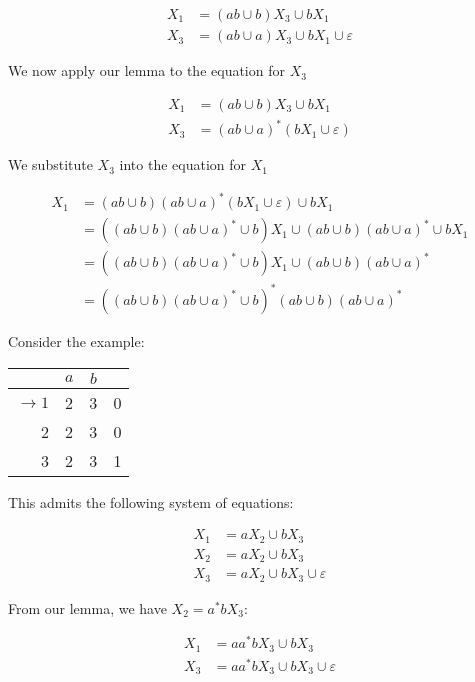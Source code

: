 \begin{align*}
      X_1 &= (ab\cup b)X_3\cup bX_1\\
      X_3 &= (ab\cup a)X_3\cup bX_1\cup\varepsilon
\end{align*}

We now apply our lemma to the equation for \(X_3\)

\begin{align*}
      X_1 &= (ab\cup b)X_3\cup bX_1\\
      X_3 &= {(ab\cup a)}^*(bX_1\cup\varepsilon)
\end{align*}

We substitute \(X_3\) into the equation for \(X_1\)

\begin{align*}
      X_1 &= (ab\cup b){(ab\cup a)}^*(bX_1\cup\varepsilon)\cup bX_1\\
          &= \left((ab\cup b){(ab\cup a)}^*\cup b\right)X_1\cup (ab\cup b){(ab\cup a)}^*\cup bX_1\\
          &= \left((ab\cup b){(ab\cup a)}^*\cup b\right)X_1\cup (ab\cup b){(ab\cup a)}^*\\
          &= {\left((ab\cup b){(ab\cup a)}^*\cup b\right)}^*(ab\cup b){(ab\cup a)}^*
\end{align*}

Consider the example:

\begin{center}\begin{tabular}{r c c r}
      & \(a\) & \(b\) & \\\bottomrule
      \(\to 1\) & 2 & 3 & 0\\
            2 & 2 & 3 & 0\\
            3 & 2 & 3 & 1
 \end{tabular}\end{center}

 This admits the following system of equations:

 \begin{align*}
      X_1 &= aX_2\cup bX_3\\
      X_2 &= aX_2\cup bX_3\\
      X_3 &= aX_2\cup bX_3\cup\varepsilon
\end{align*}

From our lemma, we have \(X_2=a^*bX_3\):

\begin{align*}
      X_1 &= aa^*bX_3\cup bX_3\\
      X_3 &= aa^*bX_3\cup bX_3\cup\varepsilon
\end{align*}

